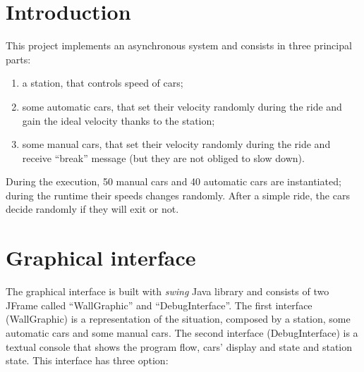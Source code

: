 \documentclass[a4paper,titlepage]{article}
\begin{document}
\begin{frontespizio}


\end{frontespizio}

\tableofcontents

\newpage

\part{Introduction}

This project implements an asynchronous system and consists in three principal parts:

\begin{enumerate}

\item a station, that controls speed of cars;

\item some automatic cars, that set their velocity randomly during the ride and gain the ideal velocity thanks to the station;

\item some manual cars, that set their velocity randomly during the ride and receive ``break'' message (but they are not obliged to slow down).

\end{enumerate}

During the execution, 50 manual cars and 40 automatic cars are instantiated; during the runtime their speeds changes randomly. After a simple ride, the cars decide randomly if they will exit or not. 

\newpage

\part{Graphical interface}

The graphical interface is built with \textit{swing} Java library and consists of two JFrame called ``WallGraphic'' and ``DebugInterface''. The first interface (WallGraphic) is a representation of the situation, composed by a station, some automatic cars and some manual cars. The second interface (DebugInterface) is a textual console that shows the program flow, cars' display and state and station state. This interface has three option:
\end{document}
